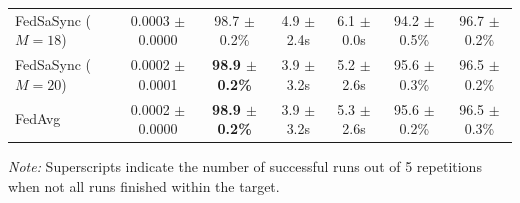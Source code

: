 \begin{table}[t]
{\begin{tabular}{lcccccc}
FedSaSync ($M = 18$) & 0.0003 $\pm$ 0.0000 & 98.7 $\pm$ 0.2\% & 4.9 $\pm$ 2.4s & 6.1 $\pm$ 0.0s & 94.2 $\pm$ 0.5\% & 96.7 $\pm$ 0.2\% \\
FedSaSync ($M = 20$) & 0.0002 $\pm$ 0.0001 & \textbf{98.9 $\pm$ 0.2\%} & 3.9 $\pm$ 3.2s & 5.2 $\pm$ 2.6s & 95.6 $\pm$ 0.3\% & 96.5 $\pm$ 0.2\% \\
FedAvg & 0.0002 $\pm$ 0.0000 & \textbf{98.9 $\pm$ 0.2\%} & 3.9 $\pm$ 3.2s & 5.3 $\pm$ 2.6s & 95.6 $\pm$ 0.2\% & 96.5 $\pm$ 0.3\% \\
\hline
\end{tabular}%
}
\par\vspace{0.8em}
\raggedright \footnotesize \textit{Note:} Superscripts indicate the number of successful runs out of 5 repetitions when not all runs finished within the target.
\end{table}